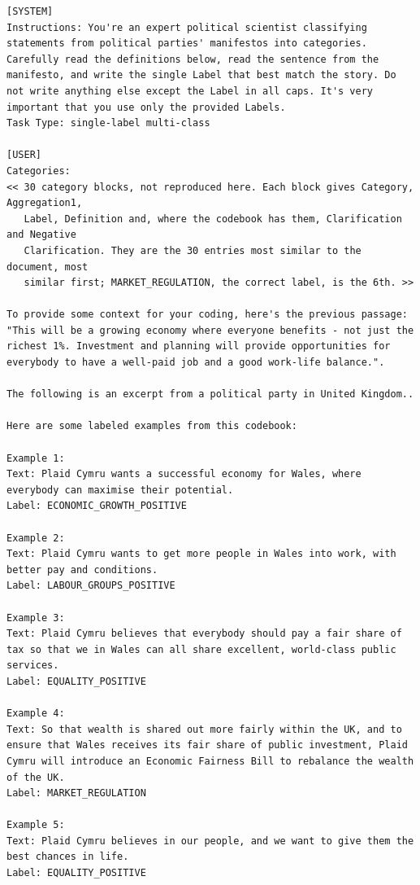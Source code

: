 \documentclass[11pt]{article}
\begin{document}
\begin{listing*}[tp]
\begin{lstlisting}
[SYSTEM]
Instructions: You're an expert political scientist classifying statements from political parties' manifestos into categories. Carefully read the definitions below, read the sentence from the manifesto, and write the single Label that best match the story. Do not write anything else except the Label in all caps. It's very important that you use only the provided Labels.
Task Type: single-label multi-class

[USER]
Categories:
<< 30 category blocks, not reproduced here. Each block gives Category, Aggregation1,
   Label, Definition and, where the codebook has them, Clarification and Negative
   Clarification. They are the 30 entries most similar to the document, most
   similar first; MARKET_REGULATION, the correct label, is the 6th. >>

To provide some context for your coding, here's the previous passage: "This will be a growing economy where everyone benefits - not just the richest 1%. Investment and planning will provide opportunities for everybody to have a well-paid job and a good work-life balance.".

The following is an excerpt from a political party in United Kingdom..

Here are some labeled examples from this codebook:

Example 1:
Text: Plaid Cymru wants a successful economy for Wales, where everybody can maximise their potential.
Label: ECONOMIC_GROWTH_POSITIVE

Example 2:
Text: Plaid Cymru wants to get more people in Wales into work, with better pay and conditions.
Label: LABOUR_GROUPS_POSITIVE

Example 3:
Text: Plaid Cymru believes that everybody should pay a fair share of tax so that we in Wales can all share excellent, world-class public services.
Label: EQUALITY_POSITIVE

Example 4:
Text: So that wealth is shared out more fairly within the UK, and to ensure that Wales receives its fair share of public investment, Plaid Cymru will introduce an Economic Fairness Bill to rebalance the wealth of the UK.
Label: MARKET_REGULATION

Example 5:
Text: Plaid Cymru believes in our people, and we want to give them the best chances in life.
Label: EQUALITY_POSITIVE


\end{lstlisting}
\end{listing*}
\end{document}
